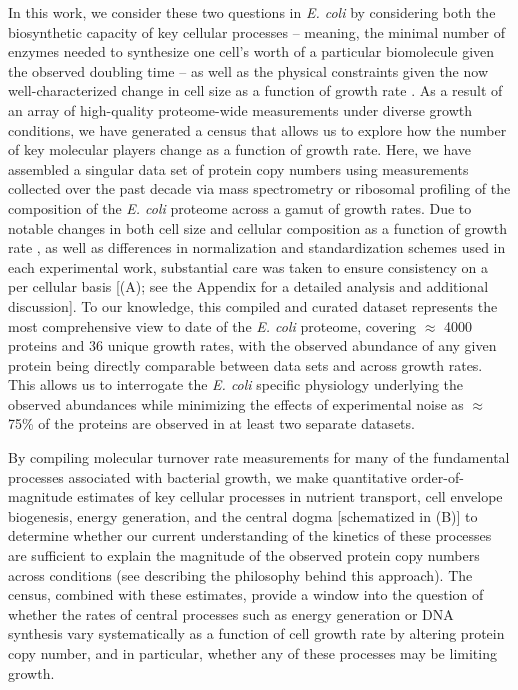 In this work, we consider these two questions in \textit{E. coli} by considering
both the biosynthetic capacity of key cellular processes --  meaning, the minimal
number of enzymes needed to synthesize one cell's worth of a particular biomolecule
given the observed doubling time --  as well as the physical constraints given the now
well-characterized change in cell size as a function of growth rate
\citep{taheriaraghi2015, si2017, basan2015}. As a result of an array of
high-quality proteome-wide measurements under diverse growth conditions, we have
generated a census that allows us to explore how the number of key molecular
players change as a function of growth rate. Here, we have assembled a singular
data set of protein copy numbers using measurements collected over the past
decade via mass spectrometry \citep{schmidt2016, peebo2015, valgepea2013} or
ribosomal profiling \citep{li2014} of the composition of the \textit{E. coli}
proteome across a gamut of growth rates. Due to notable changes in both cell
size and cellular composition as a function of growth rate \citep{bremer2008,
taheriaraghi2015}, as well as differences in normalization and standardization
schemes used in each experimental work, substantial care was taken to ensure
consistency on a per cellular basis [(A); see the Appendix for a detailed analysis
and additional discussion]. To our knowledge, this compiled and curated dataset
represents the most comprehensive view to date of the \textit{E. coli} proteome,
covering $\approx$ 4000 proteins and 36 unique growth rates, with the observed
abundance of any given protein being directly comparable between data sets and
across growth rates. This allows us to interrogate the \textit{E. coli} specific
physiology underlying the observed abundances while minimizing the effects of
experimental noise as $\approx$ 75\% of the  proteins are observed in at least
two separate datasets.

By compiling molecular turnover rate measurements for many of the
fundamental processes associated with bacterial growth, we make quantitative
order-of-magnitude estimates of key cellular processes in nutrient transport,
cell envelope biogenesis, energy generation, and the central dogma [schematized
in (B)] to determine whether our current understanding of the
kinetics of these processes are sufficient to explain the magnitude of the
observed protein copy numbers across conditions (see 
describing the philosophy behind this approach). The census, combined with these
estimates, provide a window into the question of whether the rates of central
processes such as energy generation or DNA synthesis vary systematically as a
function of cell growth rate by altering protein copy number, and in particular,
whether any of these processes may be limiting growth.

